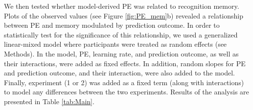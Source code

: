 \documentclass[a4paper,12pt]{article}
\begin{document}
\par
 We then tested whether model-derived PE was related to recognition memory. Plots of the observed values (see Figure \ref{fig:PE_mem}b) revealed a relationship between PE and memory modulated by prediction outcome. In order to statistically test for the significance of this relationship, we used a generalized linear-mixed model where participants were treated as random effects (see Methods). In the model, PE, learning rate, and prediction outcome, as well as their interactions, were added as fixed effects. In addition, random slopes for PE and prediction outcome, and their interaction, were also added to the model. Finally, experiment (1 or 2) was added as a fixed term (along with interactions) to model any differences between the two experiments. Results of the analysis are presented in Table \ref{tab:Main}.
  
\end{document}
